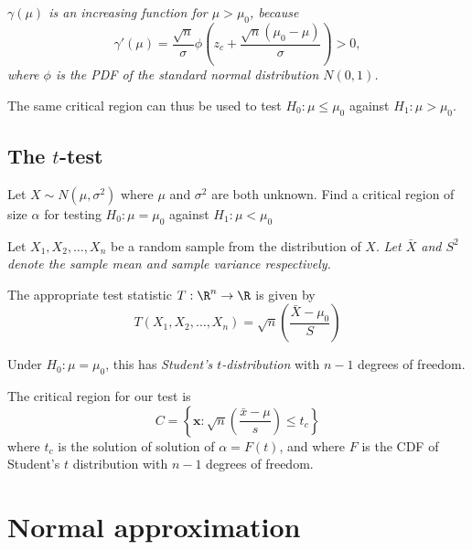\begin{solution}
\it %
$\gamma(\mu)$ is an increasing function for $\mu>\mu_0$, because
\[
\gamma'(\mu) = \frac{\sqrt{n}}{\sigma} \phi\left(z_c + \frac{\sqrt{n}(\mu_0-\mu)}{\sigma}\right) > 0,
\]
where $\phi$ is the PDF of the standard normal distribution $N(0,1)$.

The same critical region can thus be used to test $H_0:\mu\leq\mu_0$ against $H_1:\mu>\mu_0$.
\een
\end{solution}


\subsection{The $t$-test}
\begin{example}
Let $X\sim N(\mu,\sigma^2)$ where $\mu$ and $\sigma^2$ are both unknown. Find a critical region of size $\alpha$ for testing $H_0:\mu=\mu_0$ against $H_1:\mu < \mu_0$
\end{example}

\begin{solution}
Let $X_1,X_2,\ldots,X_n$ be a random sample from the distribution of $X$.
\bit
\it Let $\bar{X}$ and $S^2$ denote the sample mean and sample variance respectively.
\eit

The appropriate test statistic $T:\R^n\to\R$ is given by
\[
T(X_1,X_2,\ldots,X_n) = \sqrt{n}\left(\frac{\bar{X}-\mu_0}{S}\right)
\]

Under $H_0:\mu=\mu_0$, this has \emph{Student's $t$-distribution} with $n-1$ degrees of freedom.

The critical region for our test is
\[
C=\left\{\mathbf{x}:\sqrt{n}\left(\frac{\bar{x}-\mu}{s}\right) \leq t_c\right\}
\]
where $t_c$ is the solution of solution of $\alpha=F(t)$, and where $F$ is the CDF of Student's $t$ distribution with $n-1$ degrees of freedom.
\end{solution}



\section{Normal approximation}


